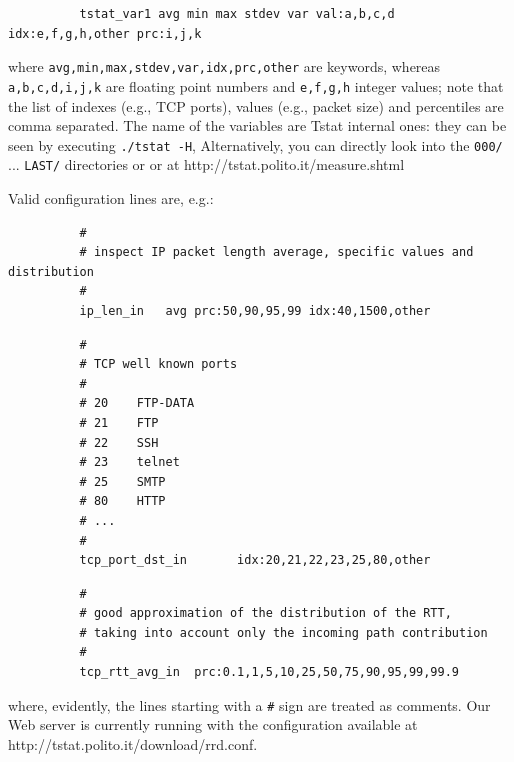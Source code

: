 \documentclass[11pt]{article}
\begin{document}
\begin{small}\begin{verbatim}
          tstat_var1 avg min max stdev var val:a,b,c,d idx:e,f,g,h,other prc:i,j,k
\end{verbatim}\end{small} \noindent
where \texttt{avg,min,max,stdev,var,idx,prc,other} are keywords, whereas \texttt{a,b,c,d,i,j,k} 
are floating point numbers and \texttt{e,f,g,h} integer values; note that
the list of indexes (e.g., TCP ports), values (e.g., packet size)
and percentiles are comma separated. The name of the variables are
Tstat internal ones: they can be seen by executing \texttt{./tstat -H},
Alternatively, you can directly look into the \texttt{000/} ...  \texttt{LAST/}  directories or
or at \textsf{http://tstat.polito.it/measure.shtml}



Valid configuration lines are, e.g.:

\begin{small}\begin{verbatim}
          #
          # inspect IP packet length average, specific values and distribution
          #
          ip_len_in   avg prc:50,90,95,99 idx:40,1500,other
\end{verbatim}\end{small} \noindent
\begin{small}\begin{verbatim}
          #
          # TCP well known ports       
          #                       
          # 20    FTP-DATA             
          # 21    FTP                  
          # 22    SSH                  
          # 23    telnet               
          # 25    SMTP                 
          # 80    HTTP                 
          # ...                        
          #
          tcp_port_dst_in       idx:20,21,22,23,25,80,other
\end{verbatim}\end{small} \noindent
\begin{small}\begin{verbatim}
          #
          # good approximation of the distribution of the RTT,
          # taking into account only the incoming path contribution
          #
          tcp_rtt_avg_in  prc:0.1,1,5,10,25,50,75,90,95,99,99.9
\end{verbatim}\end{small} \noindent
where, evidently, the lines starting with a \texttt{\#} sign are treated as comments.
Our Web server is currently running with the configuration
available at \textsf{http://tstat.polito.it/download/rrd.conf}.
\end{document}
